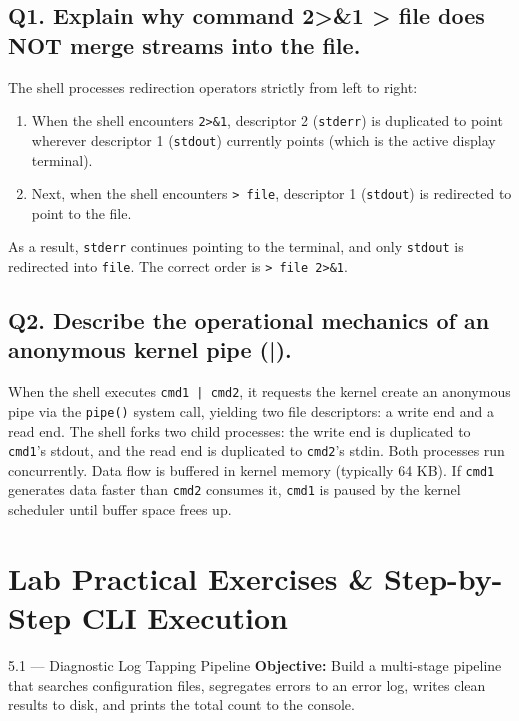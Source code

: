 \subsection*{Q1. Explain why command 2>\&1 > file does NOT merge streams into the file.}
\begin{vivasol}
The shell processes redirection operators strictly from left to right:
\begin{enumerate}
    \item When the shell encounters \texttt{2>\&1}, descriptor 2 (\texttt{stderr}) is duplicated to point wherever descriptor 1 (\texttt{stdout}) currently points (which is the active display terminal).
    \item Next, when the shell encounters \texttt{> file}, descriptor 1 (\texttt{stdout}) is redirected to point to the file.
\end{enumerate}
As a result, \texttt{stderr} continues pointing to the terminal, and only \texttt{stdout} is redirected into \texttt{file}. The correct order is \texttt{> file 2>\&1}.
\end{vivasol}

\subsection*{Q2. Describe the operational mechanics of an anonymous kernel pipe (|).}
\begin{vivasol}
When the shell executes \texttt{cmd1 | cmd2}, it requests the kernel create an anonymous pipe via the \texttt{pipe()} system call, yielding two file descriptors: a write end and a read end. The shell forks two child processes: the write end is duplicated to \texttt{cmd1}'s stdout, and the read end is duplicated to \texttt{cmd2}'s stdin. Both processes run concurrently. Data flow is buffered in kernel memory (typically 64 KB). If \texttt{cmd1} generates data faster than \texttt{cmd2} consumes it, \texttt{cmd1} is paused by the kernel scheduler until buffer space frees up.
\end{vivasol}

\section{Lab Practical Exercises \& Step-by-Step CLI Execution}

\begin{practicalbox}{5.1 --- Diagnostic Log Tapping Pipeline}
\textbf{Objective:} Build a multi-stage pipeline that searches configuration files, segregates errors to an error log, writes clean results to disk, and prints the total count to the console.
\end{practicalbox}
